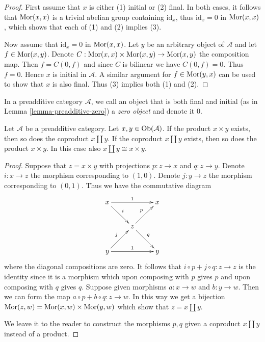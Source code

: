 \begin{proof}
First assume that $x$ is either (1) initial
or (2) final.
In both cases, it follows that $\mathop{\mathrm{Mor}}\nolimits(x,x)$ is
a trivial abelian group
containing $\text{id}_x$, thus $\text{id}_x =
0$ in
$\mathop{\mathrm{Mor}}\nolimits(x, x)$, which shows that each of (1)
and (2) implies (3).

\medskip\noindent
Now assume that $\text{id}_x = 0$ in
$\mathop{\mathrm{Mor}}\nolimits(x,x)$. Let $y$
be an arbitrary object of $\mathcal{A}$ and
let $f \in \mathop{\mathrm{Mor}}\nolimits(x ,y)$.
Denote $C : \mathop{\mathrm{Mor}}\nolimits(x,x) \times \mathop{\mathrm{Mor}}\nolimits(x,y) \to
\mathop{\mathrm{Mor}}\nolimits(x,y)$ the composition map.
Then $f = C(0, f)$ and since $C$ is bilinear
we have $C(0, f) = 0$.
Thus $f = 0$. Hence $x$ is initial in
$\mathcal{A}$.
A similar argument for $f \in \mathop{\mathrm{Mor}}\nolimits(y, x)$ can
be used to show that
$x$ is also final. Thus (3) implies both (1)
and (2).
\end{proof}

\begin{definition}
\label{definition-zero-object}
In a preadditive category $\mathcal{A}$, we
call an object that is both
final and initial (as in Lemma
\ref{lemma-preadditive-zero}) a
{\it zero object} and denote it $0$.
\end{definition}

\begin{lemma}
\label{lemma-preadditive-direct-sum}
Let $\mathcal{A}$ be a preadditive category.
Let $x, y \in \mathop{\mathrm{Ob}}\nolimits(\mathcal{A})$.
If the product $x \times y$ exists, then so
does
the coproduct $x \amalg y$.
If the coproduct $x \amalg y$ exists, then so
does
the product $x \times y$. In this case
also $x \amalg y \cong x \times y$.
\end{lemma}

\begin{proof}
Suppose that $z = x \times y$ with
projections
$p : z \to x$ and $q : z \to y$. Denote $i :
x \to z$
the morphism corresponding to $(1, 0)$.
Denote $j : y \to z$
the morphism corresponding to $(0, 1)$. Thus
we have the
commutative diagram
$$
\xymatrix{
x \ar[rr]^1 \ar[rd]^i & & x \\
& z \ar[ru]^p \ar[rd]^q & \\
y \ar[rr]^1 \ar[ru]^j & & y
}
$$
where the diagonal compositions are zero. It
follows that
$i \circ p + j \circ q : z \to z$ is the
identity since
it is a morphism which upon composing with
$p$ gives $p$
and upon composing with $q$ gives $q$.
Suppose given morphisms $a : x \to w$ and $b
: y \to w$.
Then we can form the map $a \circ p + b \circ
q : z \to w$.
In this way we get a bijection $\mathop{\mathrm{Mor}}\nolimits(z, w)
= \mathop{\mathrm{Mor}}\nolimits(x, w) \times \mathop{\mathrm{Mor}}\nolimits(y, w)$ which
show that $z = x \amalg y$.

\medskip\noindent
We leave it to the reader to construct the
morphisms
$p, q$ given a coproduct $x \amalg y$ instead
of a
product.
\end{proof}

